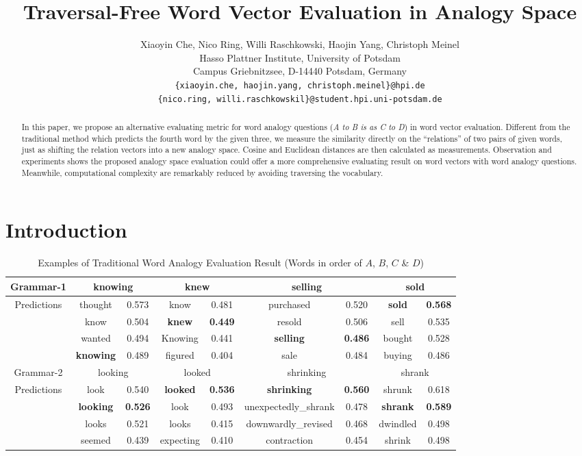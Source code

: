 \documentclass[11pt,letterpaper]{article}
\title{Traversal-Free Word Vector Evaluation in Analogy Space}
\author{Xiaoyin Che, Nico Ring, Willi Raschkowski, Haojin Yang, Christoph Meinel\\
Hasso Plattner Institute, University of Potsdam\\
Campus Griebnitzsee, D-14440 Potsdam, Germany\\
  {\tt \{xiaoyin.che, haojin.yang, christoph.meinel\}@hpi.de}\\
 {\tt \{nico.ring, willi.raschkowskil\}@student.hpi.uni-potsdam.de}}
\date{}
\begin{document}
\maketitle

\begin{abstract}
In this paper, we propose an alternative evaluating metric for word analogy questions (\textit{A to B is as C to D}) in word vector evaluation. Different from the traditional method which predicts the fourth word by the given three, we measure the similarity directly on the ``relations'' of two pairs of given words, just as shifting the relation vectors into a new analogy space. Cosine and Euclidean distances are then calculated as measurements. Observation and experiments shows the proposed analogy space evaluation could offer a more comprehensive evaluating result on word vectors with word analogy questions. Meanwhile, computational complexity are remarkably reduced by avoiding traversing the vocabulary.
\end{abstract}


\section{Introduction}

\begin{table*}
\centering
\caption{Examples of Traditional Word Analogy Evaluation Result (Words in order of $A$, $B$, $C$ \& $D$)}
\begin{tabular}{c | c c | c c | c c | c c}
\hline
Grammar-1 & \multicolumn{2}{c|}{knowing} & \multicolumn{2}{c|}{knew} & \multicolumn{2}{c|}{selling} & \multicolumn{2}{c}{sold}\\
\hline
\multicolumn{1}{c|}{\multirow{4}{*}{Predictions}} & thought & 0.573 & know & 0.481 & purchased & 0.520 & \textbf{sold} & \textbf{0.568} \\
& know & 0.504 & \textbf{knew} & \textbf{0.449} & resold & 0.506 & sell & 0.535\\
& wanted & 0.494 & Knowing & 0.441 & \textbf{selling} & \textbf{0.486} & bought & 0.528\\
& \textbf{knowing} & 0.489 & figured & 0.404 & sale & 0.484 & buying & 0.486\\
\hline
Grammar-2 & \multicolumn{2}{c|}{looking} & \multicolumn{2}{c|}{looked} & \multicolumn{2}{c|}{shrinking} & \multicolumn{2}{c}{shrank}\\
\hline
\multicolumn{1}{c|}{\multirow{4}{*}{Predictions}} & look & 0.540 & \textbf{looked} & \textbf{0.536} & \textbf{shrinking} & \textbf{0.560} & shrunk & 0.618 \\
& \textbf{looking} & \textbf{0.526} & look & 0.493 & unexpectedly\_shrank & 0.478 & \textbf{shrank} & \textbf{0.589}\\
& looks & 0.521 & looks & 0.415 & downwardly\_revised & 0.468 & dwindled & 0.498\\
& seemed & 0.439 & expecting & 0.410 & contraction & 0.454 & shrink & 0.498\\
\hline
\end{tabular}
\end{table*}
\end{document}
